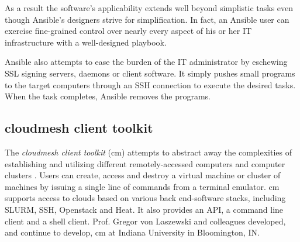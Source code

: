 \documentclass[9pt,twocolumn,twoside]{../../styles/osajnl}
\begin{document}
As a result the software's applicability extends well beyond simplistic tasks even though Ansible's designers strive for simplification.  In fact, an Ansible user can exercise fine-grained control over nearly every aspect of his or her IT infrastructure with a well-designed playbook.  

Ansible also attempts to ease the burden of the IT administrator by eschewing SSL signing servers, daemons or client software.  It simply pushes small programs to the target computers through an SSH connection to execute the desired tasks.  When the task completes, Ansible removes the programs. 

\subsection{cloudmesh client toolkit}
The \textit{cloudmesh client toolkit} (cm) attempts to abstract away the complexities of establishing and utilizing different remotely-accessed computers and computer clusters \cite{www-cm}.  Users can create, access and destroy a virtual machine or cluster of machines by issuing a single line of commands from a terminal emulator.  cm supports access to clouds based on various back end-software stacks, including SLURM, SSH, Openstack and Heat.  It also provides an API, a command line client and a shell client.  Prof. Gregor von Laszewski and colleagues developed, and continue to develop, cm at Indiana University in Bloomington, IN.
\end{document}
